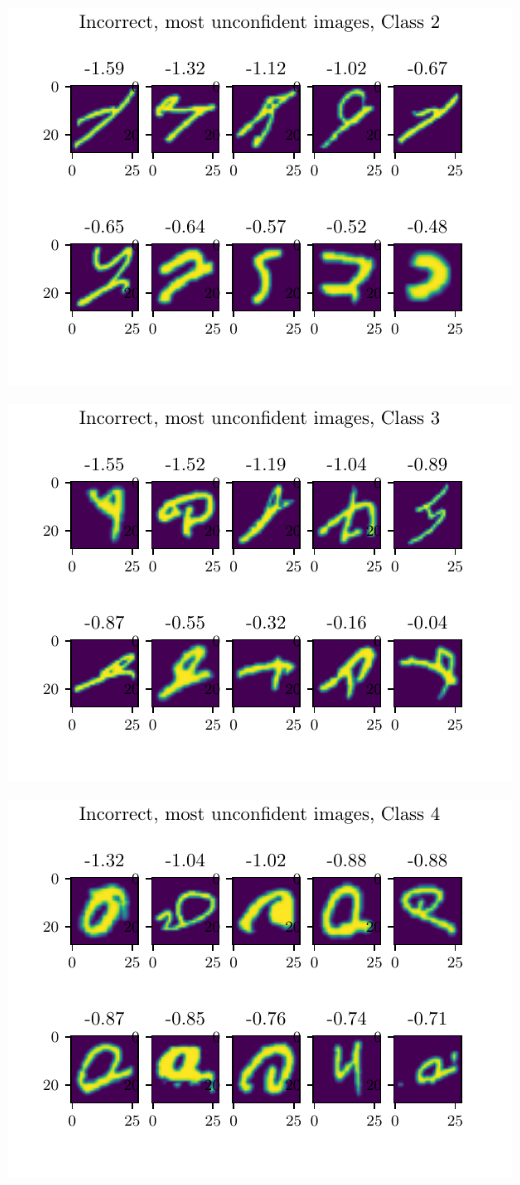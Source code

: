 \documentclass[11pt]{article}
\begin{document}
\includegraphics{figures/2d_unconfident_imgs_class_2.pdf}

\includegraphics{figures/2d_unconfident_imgs_class_3.pdf}

\includegraphics{figures/2d_unconfident_imgs_class_4.pdf}
\end{document}
